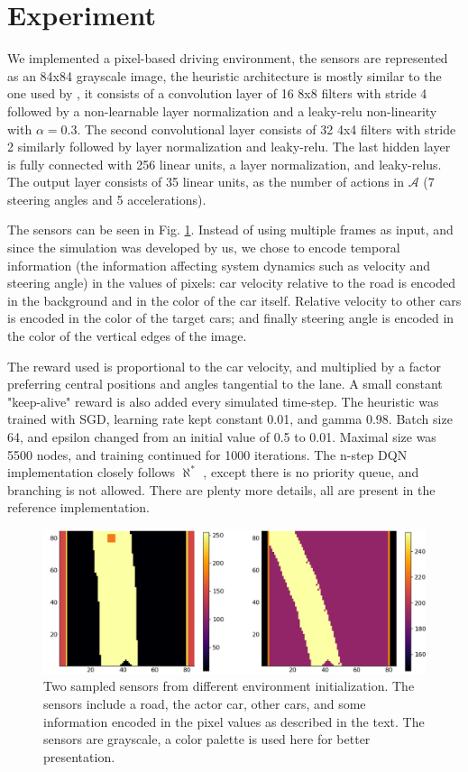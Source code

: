 \documentclass{article}
\newcommand{\alephstar}{$\aleph^*$ }
\begin{document}
\section{Experiment}
\label{sec:experiment}

We implemented a pixel-based driving environment, the sensors are represented as an 84x84 grayscale image, the heuristic architecture is mostly similar to the one used by \cite{mnih2013playing}, it consists of a convolution layer of 16 8x8 filters with stride 4 followed by a non-learnable layer normalization \citep{ba2016layer} and a leaky-relu non-linearity \citep{xu2015empirical} with $\alpha=0.3$. The second convolutional layer consists of 32 4x4 filters with stride 2 similarly followed by layer normalization and leaky-relu. The last hidden layer is fully connected with 256 linear units, a layer normalization, and leaky-relus. The output layer consists of 35 linear units, as the number of actions in $\mathcal{A}$ (7 steering angles and 5 accelerations).

The sensors can be seen in Fig. \ref{fig:sensors}. Instead of using multiple frames as input, and since the simulation was developed by us, we chose to encode temporal information (the information affecting system dynamics such as velocity and steering angle) in the values of pixels: car velocity relative to the road is encoded in the background and in the color of the car itself. Relative velocity to other cars is encoded in the color of the target cars; and finally steering angle is encoded in the color of the vertical edges of the image.

The reward used is proportional to the car velocity, and multiplied by a factor preferring central positions and angles tangential to the lane. A small constant "keep-alive" reward is also added every simulated time-step. The heuristic was trained with SGD, learning rate kept constant 0.01, and gamma 0.98. Batch size 64, and epsilon changed from an initial value of 0.5 to 0.01. Maximal size was 5500 nodes, and training continued for 1000 iterations. The n-step DQN implementation closely follows \alephstar, except there is no priority queue, and branching is not allowed. There are plenty more details, all are present in the reference implementation.

\begin{figure}[h]
  \centering
  \includegraphics[width=1.0\textwidth]{images/sensors.png}
  \caption{Two sampled sensors from different environment initialization. The sensors include a road, the actor car, other cars, and some information encoded in the pixel values as described in the text. The sensors are grayscale, a color palette is used here for better presentation. }
  \label{fig:sensors}
\end{figure}
\end{document}
